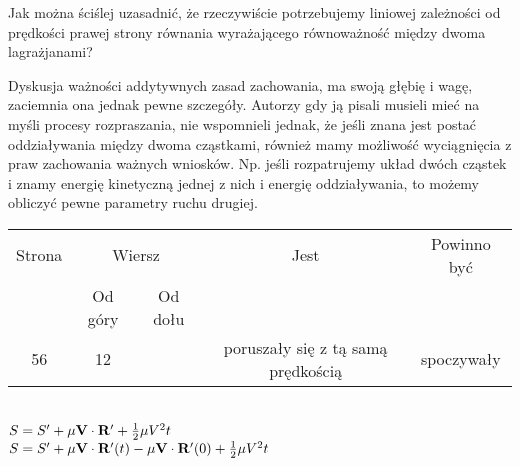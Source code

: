 \documentclass[a4paper,11pt]{article}
\numberwithin{equation}{section}
\begin{document}
\VerSpaceFour





\noindent
{} Jak można ściślej uzasadnić, że rzeczywiście
potrzebujemy liniowej zależności od prędkości prawej strony równania
wyrażającego równoważność między dwoma lagrażjanami? \Dok

\VerSpaceFour




\noindent
{} Dyskusja ważności addytywnych zasad zachowania, ma
swoją głębię i wagę, zaciemnia ona jednak pewne szczegóły. Autorzy gdy
ją pisali musieli mieć na myśli procesy rozpraszania, nie wspomnieli
jednak, że jeśli znana jest postać oddziaływania między dwoma
cząstkami, również mamy możliwość wyciągnięcia z praw zachowania
ważnych wniosków. Np. jeśli rozpatrujemy układ dwóch cząstek i znamy
energię kinetyczną jednej z nich i energię oddziaływania, to możemy
obliczyć pewne parametry ruchu drugiej.

\VerSpaceFour










\newpage



\begin{center}

  \begin{tabular}{|c|c|c|c|c|}
    \hline
    Strona & \multicolumn{2}{c|}{Wiersz} & Jest
                              & Powinno być \\ \cline{2-3}
    & Od góry & Od dołu & & \\
    \hline
    56  & 12 & & poruszały się z tą samą prędkością & spoczywały \\
    \hline
  \end{tabular}

\end{center}

\VerSpaceTwo


\noindent
{} \\
\Jest  $S = S' + \mu \mathbf{V} \cdot \mathbf{R}' + \frac{ 1 }{ 2 } \mu V^{ 2 } t$ \\
\Powin $S = S' + \mu \mathbf{V} \cdot \mathbf{R}'( t ) - \mu \mathbf{V}
\cdot \mathbf{R}'( 0 ) + \frac{ 1 }{ 2 } \mu V^{ 2 } t$ \\
\end{document}
